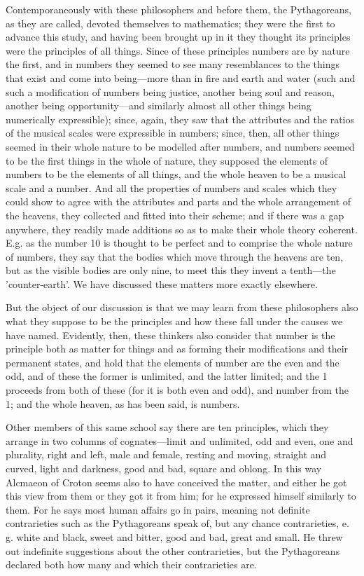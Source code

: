 Contemporaneously with these philosophers and before them, the Pythagoreans, as they are called, devoted themselves to mathematics; they were the first to advance this study, and having been brought up in it they thought its principles were the principles of all things. Since of these principles numbers are by nature the first, and in numbers they seemed to see many resemblances to the things that exist and come into being—more than in fire and earth and water (such and such a modification of numbers being justice, another being soul and reason, another being opportunity—and similarly almost all other things being numerically expressible); since, again, they saw that the attributes and the ratios of the musical scales were expressible in numbers; since, then, all other things seemed in their whole nature to be modelled after numbers, and numbers seemed to be the first things in the whole of nature, they supposed the elements of numbers to be the elements of all things, and the whole heaven to be a musical scale and a number. And all the properties of numbers and scales which they could show to agree with the attributes and parts and the whole arrangement of the heavens, they collected and fitted into their scheme; and if there was a gap anywhere, they readily made additions so as to make their whole theory coherent. E.g. as the number 10 is thought to be perfect and to comprise the whole nature of numbers, they say that the bodies which move through the heavens are ten, but as the visible bodies are only nine, to meet this they invent a tenth—the 'counter-earth'. We have discussed these matters more exactly elsewhere.

But the object of our discussion is that we may learn from these philosophers also what they suppose to be the principles and how these fall under the causes we have named. Evidently, then, these thinkers also consider that number is the principle both as matter for things and as forming their modifications and their permanent states, and hold that the elements of number are the even and the odd, and of these the former is unlimited, and the latter limited; and the 1 proceeds from both of these (for it is both even and odd), and number from the 1; and the whole heaven, as has been said, is numbers.

Other members of this same school say there are ten principles, which they arrange in two columns of cognates—limit and unlimited, odd and even, one and plurality, right and left, male and female, resting and moving, straight and curved, light and darkness, good and bad, square and oblong. In this way Alcmaeon of Croton seems also to have conceived the matter, and either he got this view from them or they got it from him; for he expressed himself similarly to them. For he says most human affairs go in pairs, meaning not definite contrarieties such as the Pythagoreans speak of, but any chance contrarieties, e. g. white and black, sweet and bitter, good and bad, great and small. He threw out indefinite suggestions about the other contrarieties, but the Pythagoreans declared both how many and which their contrarieties are.

